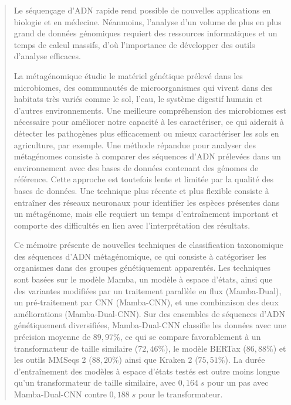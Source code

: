 \begin{abstract}
Le séquençage d'ADN rapide rend possible de nouvelles applications en biologie et en médecine.
Néanmoins, l'analyse d'un volume de plus en plus grand de données génomiques requiert des ressources
informatiques et un temps de calcul massifs, d'où l'importance de développer des outils d'analyse
efficaces.

La métagénomique étudie le matériel génétique prélevé dans les microbiomes, des communautés de
microorganismes qui vivent dans des habitats très variés comme le sol, l'eau, le système digestif
humain et d'autres environnements. Une meilleure compréhension des microbiomes est nécessaire pour
améliorer notre capacité à les caractériser, ce qui aiderait à détecter les pathogènes plus
efficacement ou mieux caractériser les sols en agriculture, par exemple. Une méthode répandue pour
analyser des métagénomes consiste à comparer des séquences d'ADN prélevées dans un environnement
avec des bases de données contenant des génomes de référence. Cette approche est toutefois lente et
limitée par la qualité des bases de données. Une technique plus récente et plus flexible consiste à
entraîner des réseaux neuronaux pour identifier les espèces présentes dans un métagénome, mais elle
requiert un temps d'entraînement important et comporte des difficultés en lien avec l'interprétation
des résultats.

Ce mémoire présente de nouvelles techniques de classification taxonomique des séquences d'ADN
métagénomique, ce qui consiste à catégoriser les organismes dans des groupes génétiquement
apparentés. Les techniques sont basées sur le modèle Mamba, un modèle à espace d'états, ainsi que
des variantes modifiées par un traitement parallèle en flux (Mamba-Dual), un pré-traitement par CNN
(Mamba-CNN), et une combinaison des deux améliorations (Mamba-Dual-CNN). Sur des ensembles de
séquences d'ADN génétiquement diversifiées, Mamba-Dual-CNN classifie les données avec une précision
moyenne de $89,97\%$, ce qui se compare favorablement à un transformateur de taille similaire
($72,46\%$), le modèle BERTax ($86,88\%$) et les outils MMSeqs 2 ($88,20\%$) ainsi que Kraken 2
($75,51\%$). La durée d'entraînement des modèles à espace d'états testés est outre moins longue
qu'un transformateur de taille similaire, avec $0,164\;s$ pour un pas avec Mamba-Dual-CNN contre
$0,188\;s$ pour le transformateur.

\end{abstract}
